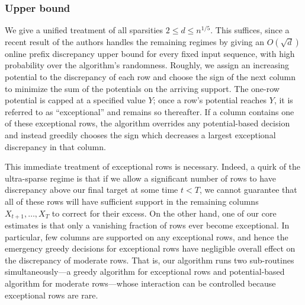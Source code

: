 \documentclass[reqno,english]{amsart}
\theoremstyle{definition}
\begin{document}
\subsubsection{Upper bound} We give a unified treatment of all sparsities $2\le d\le {n^{1/5}}$. This suffices, since a recent result of the authors \cite{altschuler-tikhomirov-bf} handles the remaining regimes by giving an $O(\sqrt d)$ online prefix discrepancy upper bound for every fixed input sequence, with high probability over the algorithm's randomness.
Roughly, we assign an increasing potential
to the discrepancy of each row and choose the sign of the next column to minimize the
sum of the potentials on the arriving support. The one-row potential is capped at a specified value $Y$; once a row's potential reaches $Y$, it is referred to as ``exceptional'' and remains so thereafter. If a column contains
one of these exceptional rows, the algorithm overrides any potential-based decision and instead greedily chooses the sign which decreases
a largest exceptional discrepancy in that column. 


This immediate treatment of exceptional rows is necessary. Indeed, a quirk of the ultra-sparse regime is that if we allow a significant number of rows to have discrepancy above our final target at some time $t < T$, we cannot guarantee that all of these rows will have sufficient support in the remaining columns $X_{t+1},\dots,X_T$ to correct for their excess. On the other hand, one of our core estimates is that only a vanishing fraction of rows ever become exceptional. In particular, few columns are supported on any exceptional rows, and hence the emergency greedy decisions for exceptional rows have negligible overall effect on the discrepancy of moderate rows. That is, our algorithm runs two sub-routines simultaneously---a greedy algorithm for exceptional rows and potential-based algorithm for moderate rows---whose interaction can be controlled because exceptional rows are rare. 
\end{document}
